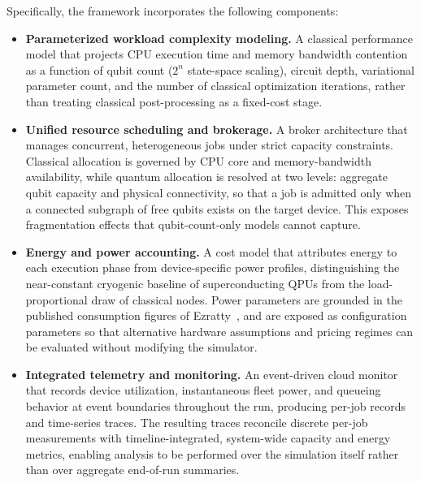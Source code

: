 
Specifically, the framework incorporates the following components:

\begin{itemize}[leftmargin=*]

  \item \textbf{Parameterized workload complexity modeling.}
  A classical performance model that projects CPU execution time and memory
  bandwidth contention as a function of qubit count ($2^{n}$ state-space
  scaling), circuit depth, variational parameter count, and the number of
  classical optimization iterations, rather than treating classical
  post-processing as a fixed-cost stage.

  \item \textbf{Unified resource scheduling and brokerage.}
  A broker architecture that manages concurrent, heterogeneous jobs under
  strict capacity constraints. Classical allocation is governed by CPU core
  and memory-bandwidth availability, while quantum allocation is resolved at
  two levels: aggregate qubit capacity and physical connectivity, so that a
  job is admitted only when a connected subgraph of free qubits exists on the
  target device. This exposes fragmentation effects that qubit-count-only
  models cannot capture.

  \item \textbf{Energy and power accounting.}
  A cost model that attributes energy to each execution phase from
  device-specific power profiles, distinguishing the near-constant cryogenic
  baseline of superconducting QPUs from the load-proportional draw of
  classical nodes. Power parameters are grounded in the published consumption
  figures of Ezratty~\cite{ezratty2023}, and are exposed as configuration
  parameters so that alternative hardware assumptions and pricing regimes can
  be evaluated without modifying the simulator.

  \item \textbf{Integrated telemetry and monitoring.}
  An event-driven cloud monitor that records device utilization, instantaneous
  fleet power, and queueing behavior at event boundaries throughout the run,
  producing per-job records and time-series traces. The resulting traces
  reconcile discrete per-job measurements with timeline-integrated,
  system-wide capacity and energy metrics, enabling analysis to be performed
  over the simulation itself rather than over aggregate end-of-run summaries.

\end{itemize}

